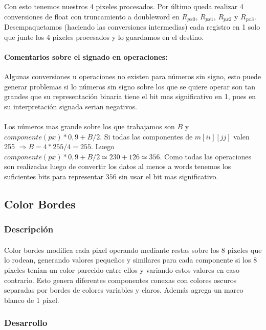 \documentclass[a4paper]{article}
\begin{document}
Con esto tenemos nuestros 4 pixeles procesados. Por \'ultimo queda realizar 4 conversiones de float con truncamiento a doubleword en $R_{px0}$, $R_{px1}$, $R_{px2}$ y $R_{px3}$. Desempaquetamos (haciendo las conversiones intermedias) cada registro en 1 solo que junte los 4 pixeles procesados y lo guardamos en el destino.

\paragraph{Comentarios sobre el signado en operaciones:} Algunas conversiones u operaciones no existen para n\'umeros sin signo, esto puede generar problemas si lo n\'umeros sin signo sobre los que se quiere operar son tan grandes que su representaci\'on binaria tiene el bit mas significativo en 1, pues en su interpretaci\'on signada serian negativos.
\paragraph{}Los n\'umeros mas grande sobre los que trabajamos son $B$ y $componente(px) * 0,9 + B/2$. Si todas las componentes de $m[ii][jj]$ valen 255 $\Rightarrow B = 4*255/4 = 255$. Luego $componente(px) * 0,9 + B/2 \simeq  230 + 126 \simeq 356$. Como todas las operaciones son realizadas luego de convertir los datos al menos a words tenemos los suficientes bits para representar $356$ sin usar el bit mas significativo.

\subsection{Color Bordes}
\subsubsection{Descripci\'on}

\paragraph{} Color bordes modifica cada pixel operando mediante restas sobre los 8 pixeles que lo rodean, generando valores pequeños y similares para cada componente si los 8 pixeles tenían un color parecido entre ellos y variando estos valores en caso contrario. Esto genera diferentes componentes conexas con colores oscuros separadas por bordes de colores variables y claros. Adem\'as agrega un marco blanco de 1 pixel.  

\subsubsection{Desarrollo}
\end{document}
